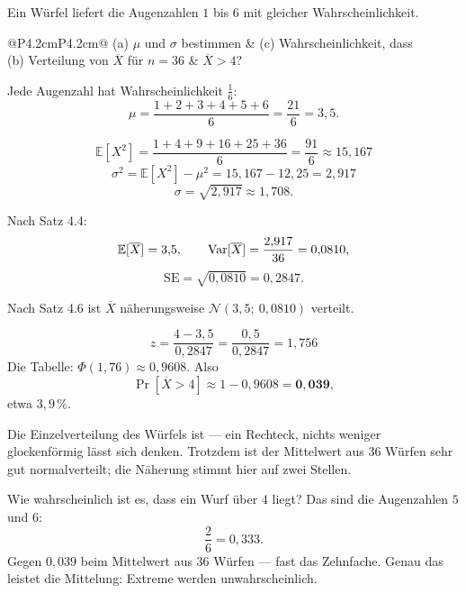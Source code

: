 \begin{aufgabe}
Ein Würfel liefert die Augenzahlen $1$ bis $6$ mit gleicher Wahrscheinlichkeit.
\begin{center}
{\small
\renewcommand{\arraystretch}{1.35}
\begin{tabular}{@{}P{4.2cm}P{4.2cm}@{}}
\toprule
(a) $\mu$ und $\sigma$ bestimmen & (c) Wahrscheinlichkeit, dass\\
(b) Verteilung von $\overline X$ für $n=36$ & \quad $\overline X > 4$?\\
\bottomrule
\end{tabular}}
\end{center}

\loesung
{}
Jede Augenzahl hat Wahrscheinlichkeit $\frac16$:
\[ \mu = \frac{1+2+3+4+5+6}{6} = \frac{21}{6} = 3{,}5 . \]

\[ \mathbb{E}[X^2] = \frac{1+4+9+16+25+36}{6} = \frac{91}{6} \approx 15{,}167 \]
\[ \sigma^2 = \mathbb{E}[X^2] - \mu^2 = 15{,}167 - 12{,}25 = 2{,}917 \]
\[ \sigma = \sqrt{2{,}917} \approx 1{,}708 . \]

Nach Satz 4.4:
\[ \mathbb{E}[\overline X] = 3{,}5, \qquad \operatorname{Var}[\overline X] = \frac{2{,}917}{36} = 0{,}0810 , \]
\[ \mathrm{SE} = \sqrt{0{,}0810} = 0{,}2847 . \]

Nach Satz 4.6 ist $\overline X$ näherungsweise $\mathcal{N}(3{,}5;\ 0{,}0810)$ verteilt.

\[ z = \frac{4 - 3{,}5}{0{,}2847} = \frac{0{,}5}{0{,}2847} = 1{,}756 \]
Die Tabelle: $\Phi(1{,}76) \approx 0{,}9608$. Also
\[ \Pr[\overline X > 4] \approx 1 - 0{,}9608 = \mathbf{0{,}039} , \]
etwa $3{,}9\,\%$.

Die Einzelverteilung des Würfels ist  --- ein Rechteck, nichts weniger glockenförmig lässt sich denken. Trotzdem ist der Mittelwert aus $36$ Würfen sehr gut normalverteilt; die Näherung stimmt hier auf zwei Stellen.

\begin{center}
\begin{minipage}{0.86\textwidth}
\end{minipage}
\end{center}

Wie wahrscheinlich ist es, dass ein  Wurf über $4$ liegt? Das sind die Augenzahlen $5$ und $6$:
\[ \frac{2}{6} = 0{,}333 . \]
Gegen $0{,}039$ beim Mittelwert aus $36$ Würfen --- fast das Zehnfache. Genau das leistet die Mittelung: Extreme werden unwahrscheinlich.
\end{aufgabe}

